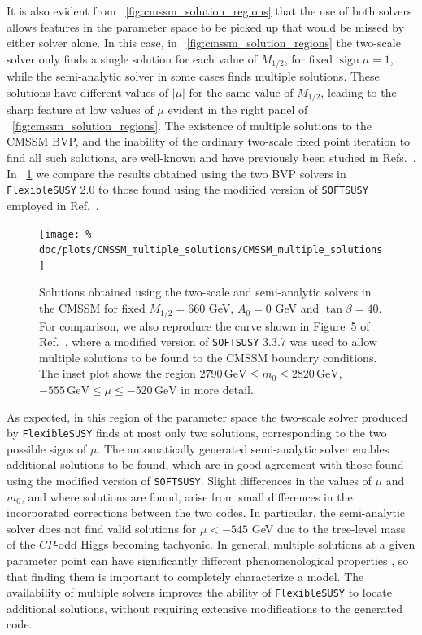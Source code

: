 \documentclass[final,3p,11pt,pdflatex]{elsarticle}
\makeatletter
\newcommand{\fs}{\texttt{FlexibleSUSY}\@\xspace}
\newcommand{\softsusy}{\texttt{SOFTSUSY}\@\xspace}
\newcommand{\fstwo}{\fs 2.0\@\xspace}
\newcommand{\unit}[1]{\,\text{#1}}      %
\newcommand{\figref}[1]{\figurename~\ref{#1}}
\newcommand{\CP}{\ensuremath{CP}\xspace}
\newcommand{\azero}{\ensuremath{A_0}\xspace}
\newcommand{\mhalf}{\ensuremath{M_{1/2}}\xspace}
\newcommand{\mzero}{\ensuremath{m_0}\xspace}
\DeclareMathOperator{\sign}{sign}
\makeatother
\begin{document}
It is also evident from \figref{fig:cmssm_solution_regions} that the use of
both solvers allows features in the parameter space to be picked up that would
be missed by either solver alone.  In this case, in
\figref{fig:cmssm_solution_regions} the two-scale solver only finds a single
solution for each value of $\mhalf$, for fixed $\sign\mu = 1$, while the
semi-analytic solver in some cases finds multiple solutions.  These
solutions have different values of $|\mu|$ for the same value of $\mhalf$,
leading to the sharp feature at low values of $\mu$ evident in the right panel
of \figref{fig:cmssm_solution_regions}.  The existence of multiple solutions to
the CMSSM BVP, and the inability of the ordinary two-scale fixed point iteration
to find all such solutions, are well-known and have previously been studied in
Refs.~\cite{Allanach:2013cda,Allanach:2013yua}.  In
\figref{fig:cmssm_multiple_solutions} we compare the results obtained using
the two BVP solvers in \fstwo to those found using the modified version of
\softsusy employed in Ref.~\cite{Allanach:2013cda}.
%
\begin{figure}
  \centering
  \texttt{[image: \%
    doc/plots/CMSSM\_multiple\_solutions/CMSSM\_multiple\_solutions]}
  \caption{Solutions obtained using the two-scale and semi-analytic solvers
    in the CMSSM for fixed $\mhalf = 660$ GeV, $\azero = 0$ GeV and
    $\tan\beta = 40$.  For comparison, we also reproduce the curve shown in
    Figure~5 of Ref.~\cite{Allanach:2013cda}, where a modified version of
    \softsusy 3.3.7 was used to allow multiple solutions to be found to the
    CMSSM boundary conditions.  The inset plot shows the region $2790\unit{GeV}
    \leq \mzero \leq 2820\unit{GeV}$, $-555\unit{GeV} \leq \mu
    \leq -520\unit{GeV}$ in more detail.}
  \label{fig:cmssm_multiple_solutions}
\end{figure}
%
As expected, in this region of the parameter space the two-scale solver
produced by \fs finds at most only two solutions, corresponding to the two
possible signs of $\mu$.  The automatically generated semi-analytic solver
enables additional solutions to be found, which are in good agreement with
those found using the modified version of \softsusy.  Slight differences in
the values of $\mu$ and $\mzero$, and where solutions are found, arise from
small differences in the incorporated corrections between the two codes.  In
particular, the semi-analytic solver does not find valid solutions for
$\mu < -545$ GeV due to the tree-level mass of the \CP-odd Higgs becoming
tachyonic.  In general, multiple solutions at a given parameter point
can have significantly different phenomenological properties
\cite{Allanach:2013yua}, so that finding them is important to completely
characterize a model.  The availability of multiple solvers improves the
ability of \fs to locate additional solutions, without requiring extensive
modifications to the generated code.
\end{document}
